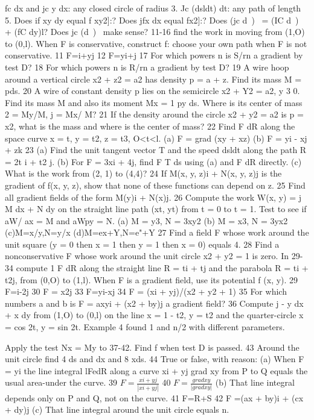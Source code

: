 fc dx and jc y dx: any closed circle of radius 3.
Jc (dsldt) dt: any path of length 5.
Does if xy dy equal f xy2]:?
Does jfx dx equal fx2]:?
Does (jc d~)~ = (IC d~)~ + (fC dy)l?
Does jc (d~)~ make sense?
11-16 find the work in moving from (1,O) to (0,l). When F
is conservative, construct f: choose your own path when F is
not conservative.
11 F=i+yj 12 F=yi+j
17 For which powers n is S/rn a gradient by test D?
18 For which powers n is R/rn a gradient by test D?
19 A wire hoop around a vertical circle x2 + z2 = a2 has
density p = a + z. Find its mass M = pds.
20 A wire of constant density p lies on the semicircle
x2 + Y2 = a2, y 3 0. Find its mass M and also its moment
Mx = 1 py ds. Where is its center of mass 2 = My/M, j = Mx/
M?
21 If the density around the circle x2 + y2 = a2 is p = x2, what
is the mass and where is the center of mass?
22 Find F dR along the space curve x = t, y = t2, z = t3,
O<t<l.
(a) F = grad (xy + xz) (b) F = yi - xj + zk
23 (a) Find the unit tangent vector T and the speed dsldt
along the path R = 2t i + t2 j.
(b) For F = 3xi + 4j, find F T ds using (a) and F dR
directly.
(c) What is the work from (2, 1) to (4,4)?
24 If M(x, y, z)i + N(x, y, z)j is the gradient of f(x, y, z), show
that none of these functions can depend on z.
25 Find all gradient fields of the form M(y)i + N(x)j.
26 Compute the work W(x, y) = j M dx + N dy on the
straight line path (xt, yt) from t = 0 to t = 1. Test to see if aW/
ax = M and aWpy = N.
(a) M = y3, N = 3xy2 (b) M = x3, N = 3yx2
(c)M=x/y,N=y/x (d)M=ex+Y,N=e"+Y
27 Find a field F whose work around the unit square (y = 0
then x = 1 then y = 1 then x = 0) equals 4.
28 Find a nonconservative F whose work around the unit
circle x2 + y2 = 1 is zero.
In 29-34 compute 1 F dR along the straight line R = ti + tj
and the parabola R = ti + t2j, from (0,O) to (1,l). When F is a
gradient field, use its potential f (x, y).
29 F=i-2j 30 F = x2j
33 F=yi-xj 34 F = (xi + yj)/(x2 + y2 + 1)
35 For which numbers a and b is F = axyi + (x2 + by)j a
gradient field?
36 Compute j - y dx + x dy from (1,O) to (0,l) on the line
x = 1 - t2, y = t2 and the quarter-circle x = cos 2t, y = sin 2t.
Example 4 found 1 and n/2 with different parameters. 

Apply the test Nx = My to 37-42. Find f when test D is passed. 43 Around the unit circle find 4 ds and  dx and 8 xds.
44 True or false, with reason:
(a) When F = yi the line integral lFedR along a curve
xi + yj grad xy from P to Q equals the usual area-under the curve.
39 $F = \frac{xi+yj}{|xi+yj|}$ 40 $F = \frac{grad xy}{|grad xy|}$
(b) That line integral depends only on P and Q, not on the
curve.
41 F=R+S 42 F =(ax + by)i + (cx + dy)j (c) That line integral around the unit circle equals n. 

